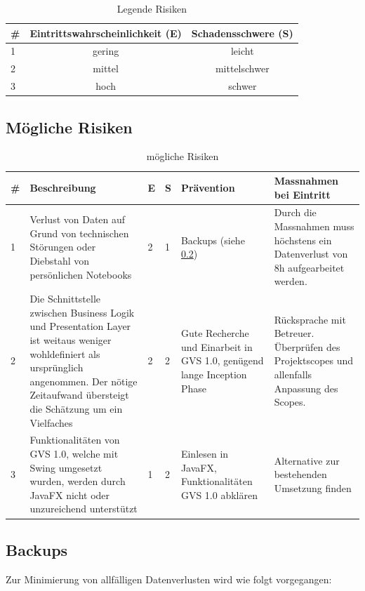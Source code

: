 \documentclass[11pt,a4paper,english,oneside]{book}
\numberwithin{equation}{chapter}
\begin{document}
	\begin{table}[h!]
		\centering
		\begin{tabularx}{0.6\linewidth}{l c c}
			\toprule 
			\# & Eintrittswahrscheinlichkeit (E) & Schadensschwere (S) \\
			\toprule 
			1 & gering & leicht  \\
			2 & mittel & mittelschwer \\
			3 & hoch & schwer \\
			\bottomrule 
		\end{tabularx} 
		\caption{Legende Risiken} 
	\end{table}
	\begin{landscape}		
		\subsection{Mögliche Risiken}
			\begin{table}[h!]
			\centering
			\begin{tabularx}{\linewidth}{l X l l X X}
				\toprule 
				\# & Beschreibung & E & S & Prävention & Massnahmen bei Eintritt \\
				\toprule 
				1 & Verlust von Daten auf Grund von technischen Störungen oder Diebstahl von persönlichen Notebooks & 2 & 1 & Backups (siehe \ref{sec:backup}) & Durch die Massnahmen muss höchstens ein Datenverlust von 8h aufgearbeitet werden. \\
				\midrule
				2 & Die Schnittstelle zwischen Business Logik und Presentation Layer ist weitaus weniger wohldefiniert als ursprünglich angenommen. Der nötige Zeitaufwand übersteigt die Schätzung um ein Vielfaches & 2 & 2 & Gute Recherche und Einarbeit in GVS 1.0, genügend lange Inception Phase & Rücksprache mit Betreuer. Überprüfen des Projektscopes und allenfalls Anpassung des Scopes. \\
				\midrule
				3 & Funktionalitäten von GVS 1.0, welche mit Swing umgesetzt wurden, werden durch JavaFX nicht oder unzureichend unterstützt & 1 & 2 & Einlesen in JavaFX, Funktionalitäten GVS 1.0 abklären & Alternative zur bestehenden Umsetzung finden \\
				\bottomrule 
			\end{tabularx} 
			\caption{mögliche Risiken} 
		\end{table}
    \end{landscape}

	\subsection{Backups}
		\label{sec:backup}
		Zur Minimierung von allfälligen Datenverlusten wird wie folgt vorgegangen:
	
\end{document}
